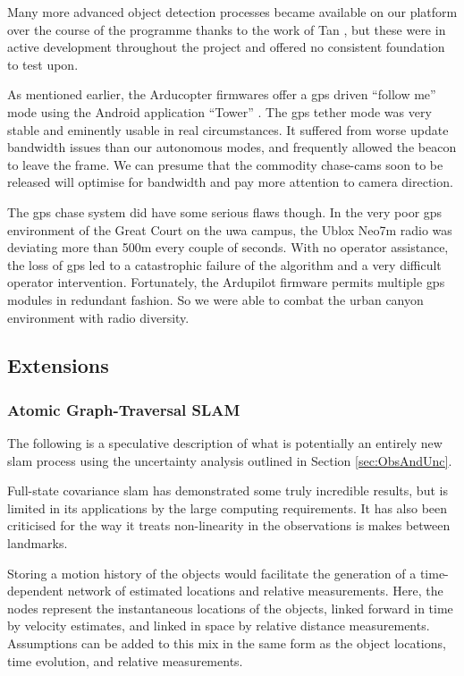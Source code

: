 \documentclass[a4paper, 11pt, titlepage]{article}
\newcounter{subsubsubsection}[subsubsection]
\begin{document}
        Many more advanced object detection processes became available on our platform over the course of the programme thanks to the work of Tan \cite{Tan}, but these were in active development throughout the project and offered no consistent foundation to test upon.

        As mentioned earlier, the Arducopter firmwares offer a \gls{gps} driven ``follow me'' mode using the Android application ``Tower'' \cite{3dr-tower}.
        The \gls{gps} tether mode was very stable and eminently usable in real circumstances.  It suffered from worse update bandwidth issues than our autonomous modes, and frequently allowed the beacon to leave the frame.  We can presume that the commodity chase-cams soon to be released will optimise for bandwidth and pay more attention to camera direction.

        The \gls{gps} chase system did have some serious flaws though.  In the very poor \gls{gps} environment of the Great Court on the \gls{uwa} campus, the Ublox Neo7m radio was deviating more than 500m every couple of seconds.  With no operator assistance, the loss of \gls{gps} led to a catastrophic failure of the algorithm and a very difficult operator intervention.  Fortunately, the Ardupilot firmware permits multiple \gls{gps} modules in redundant fashion.  So we were able to combat the urban canyon environment with radio diversity.

    \subsection{Extensions}

      \subsubsection{Atomic Graph-Traversal SLAM}

      \label{sec:SLAMproposal}
        The following is a speculative description of what is potentially an entirely new \gls{slam} process using the uncertainty analysis outlined in Section \ref{sec:ObsAndUnc}.

        Full-state covariance \gls{slam} has demonstrated some truly incredible results, but is limited in its applications by the large computing requirements.  It has also been criticised for the way it treats non-linearity in the observations is makes between landmarks.


        Storing a motion history of the objects would facilitate the generation of a time-dependent network of estimated locations and relative measurements.
        Here, the nodes represent the instantaneous locations of the objects, linked forward in time by velocity estimates, and linked in space by relative distance measurements.  Assumptions can be added to this mix in the same form as the object locations, time evolution, and relative measurements.
\end{document}
